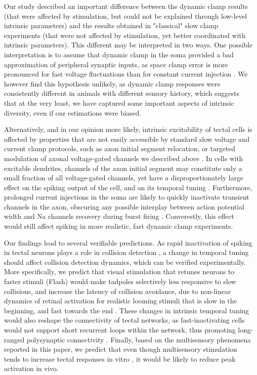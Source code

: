 \documentclass{article}
\begin{document}
Our study described an important difference between the dynamic clamp results (that were affected by stimulation, but could not be explained through low-level intrinsic parameters) and the results obtained in "classical" slow clamp experiments (that were not affected by stimulation, yet better coordinated with intrinsic parameters). This different may be interpreted in two ways. One possible interpretation is to assume that dynamic clamp in the soma provided a bad approximation of peripheral synaptic inputs, as space clamp error is more pronounced for fast voltage fluctuations than for constant current injection \citep{spruston1993,prinz2004}. We however find this hypothesis unlikely, as dynamic clamp responses were consistently different in animals with different sensory history, which suggests that at the very least, we have captured some important aspects of intrinsic diversity, even if our estimations were biased. 

Alternatively, and in our opinion more likely, intrinsic excitability of tectal cells is affected by properties that are not easily accessible by standard slow voltage and current clamp protocols, such as axon initial segment relocation, or targeted modulation of axonal voltage-gated channels we described above \citep{grubb2010activity,kole2012}. In cells with excitable dendrites, channels of the axon initial segment may constitute only a small fraction of all voltage-gated channels, yet have a disproportionately large effect on the spiking output of the cell, and on its temporal tuning \citep{kole2007,hamada2016}. Furthermore, prolonged current injections in the soma are likely to quickly inactivate transient channels in the axon, obscuring any possible interplay between action potential width and Na channels recovery during burst firing \citep{popovic2011,kole2012}. Converestly, this effect would still affect spiking in more realistic, fast dynamic clamp experiments.

Our findings lead to several verifiable predictions. As rapid inactivation of spiking in tectal neurons plays a role in collision detection \citep{khakhalin2014,jang2016}, a change in temporal tuning should affect collision detection dynamics, which can be verified experimentally. More specifically, we predict that visual stimulation that retunes neurons to faster stimuli (Flash) would make tadpoles selectively less responsive to slow collisions, and increase the latency of collision avoidance, due to non-linear dynamics of retinal activation for realistic looming stimuli that is slow in the beginning, and fast towards the end \citep{jang2016}. These changes in intrinsic temporal tuning would also reshape the connectivity of tectal networks, as fast-inactivating cells would not support short recurrent loops within the network, thus promoting long-ranged polysynaptic connectivity \citep{fiete2010stdp,clopath2010stdp}. Finally, based on the multisensory phenomena reported in this paper, we predict that even though multisensory stimulation tends to increase tectal responses in vitro \citep{felch2016,truszkowski2017}, it would be likely to reduce peak activation in vivo. 
\end{document}
